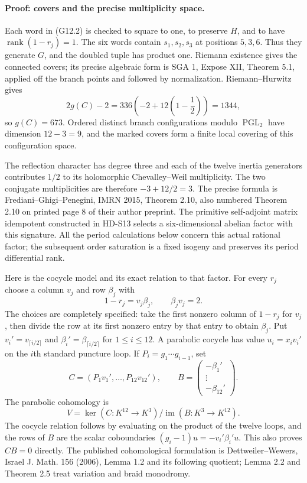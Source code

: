 \paragraph{Proof: covers and the precise multiplicity space.}
Each word in (G12.2) is checked to square to one, to preserve $H$,
and to have $\operatorname{rank}(1-r_j)=1$. The six words contain
$s_1,s_2,s_3$ at positions $5,3,6$. Thus they generate $G$, and the
doubled tuple has product one. Riemann existence gives the connected
covers; its precise algebraic form is SGA 1, Expose XII, Theorem 5.1,
applied off the branch points and followed by normalization.
Riemann--Hurwitz gives
\[
2g(C)-2=336\left(-2+12\left(1-\frac12\right)\right)=1344,
\]
so $g(C)=673$. Ordered distinct branch configurations modulo
$\operatorname{PGL}_2$ have dimension $12-3=9$, and the marked covers
form a finite local covering of this configuration space.

The reflection character has degree three and each of the twelve
inertia generators contributes $1/2$ to its holomorphic
Chevalley--Weil multiplicity. The two conjugate multiplicities are
therefore $-3+12/2=3$. The precise formula is
Frediani--Ghigi--Penegini, IMRN 2015, Theorem 2.10, also numbered
Theorem 2.10 on printed page 8 of their author preprint.
The primitive self-adjoint matrix idempotent constructed in HD-S13
selects a six-dimensional abelian factor with this signature.
All the period calculations below concern this actual rational factor;
the subsequent order saturation is a fixed isogeny and preserves its
period differential rank.

Here is the cocycle model and its exact relation to that factor.
For every $r_j$ choose a column $v_j$ and row $\beta_j$ with
\[
1-r_j=v_j\beta_j,\qquad \beta_jv_j=2.
\tag{G12.4}
\]
The choices are completely specified: take the first nonzero column
of $1-r_j$ for $v_j$, then divide the row at its first nonzero entry
by that entry to obtain $\beta_j$.
Put $v_i'=v_{\lceil i/2\rceil}$ and
$\beta_i'=\beta_{\lceil i/2\rceil}$ for $1\le i\le12$.
A parabolic cocycle has value $u_i=x_iv_i'$ on the $i$th standard
puncture loop. If $P_i=g_1\cdots g_{i-1}$, set
\[
C=(P_1v_1',\ldots,P_{12}v_{12}'),\qquad
B=\begin{pmatrix}-\beta_1'\\ \vdots\\-\beta_{12}'\end{pmatrix}.
\]
The parabolic cohomology is
\[
V=\ker(C:K^{12}\longrightarrow K^3)/\operatorname{im}(B:K^3\longrightarrow K^{12}).
\tag{G12.5}
\]
The cocycle relation follows by evaluating on the product of the
twelve loops, and the rows of $B$ are the scalar coboundaries
$(g_i-1)u=-v_i'\beta_i'u$. This also proves $CB=0$ directly.
The published cohomological formulation is Dettweiler--Wewers,
Israel J. Math. 156 (2006), Lemma 1.2 and its following quotient;
Lemma 2.2 and Theorem 2.5 treat variation and braid monodromy.

